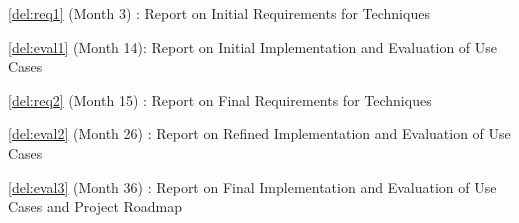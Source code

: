 \begin{Workpackage}{\thewpno}
\begin{WPDeliverables}
  \begin{compactitem}
\item \ref{del:req1} (Month 3) : Report on Initial Requirements for \TheProject{} Techniques
\item \ref{del:eval1} (Month 14): Report on Initial Implementation and Evaluation of Use Cases
\item \ref{del:req2} (Month 15) : Report on Final Requirements for \TheProject{} Techniques
\item \ref{del:eval2} (Month 26) : Report on Refined Implementation and Evaluation of Use Cases
\item \ref{del:eval3} (Month 36) : Report on Final Implementation and Evaluation of Use Cases and Project Roadmap
\end{compactitem}
\end{WPDeliverables}
\end{Workpackage}
